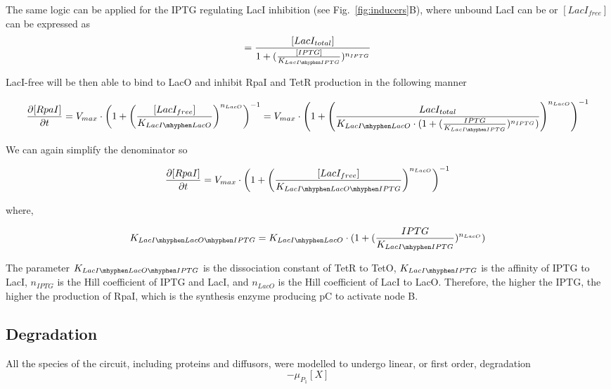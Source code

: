 The same logic can be applied for the IPTG regulating LacI inhibition (see Fig.~\ref{fig:inducers}B),
where unbound LacI can be or $[LacI_{free}]$ can be expressed as
\begin{equation}
[LacI{free}] =  \frac{[LacI_{total}]}{1+(\frac{[IPTG]}{K_{LacI \mhyphen IPTG}})^{n_{IPTG}}}
\end{equation}

LacI-free will be then able to bind to LacO and inhibit RpaI and TetR production in the following manner

\begin{equation}
    \pdv{[RpaI]}{t} = V_{max}\cdot \left(1+\left(\frac{[LacI_{free}]}{K_{LacI \mhyphen LacO}}\right)^{n_{LacO}}\right)^{-1} = V_{max} \cdot \left(1+\left(\frac{LacI_{total}}{K_{LacI \mhyphen LacO}\cdot(1+(\frac{IPTG}{K_{LacI \mhyphen IPTG}})^{n_{IPTG}})}\right)^{n_{LacO}}\right)^{-1}
\end{equation}


We can again simplify the denominator so

\begin{equation}
    \pdv{[RpaI]}{t} = V_{max}\cdot \left(1+\left(\frac{[LacI_{free}]}{K_{LacI \mhyphen LacO \mhyphen IPTG }}\right)^{n_{LacO}}\right)^{-1}
\end{equation}

where,

\begin{equation}
    K_{LacI \mhyphen LacO \mhyphen IPTG} = K_{LacI \mhyphen LacO}\cdot(1+(\frac{IPTG}{K_{LacI \mhyphen IPTG}})^{n_{LacO}})
\end{equation}

The parameter $K_{LacI \mhyphen LacO \mhyphen IPTG}$ is the dissociation constant of TetR to TetO, $K_{LacI \mhyphen IPTG}$
is the affinity of IPTG to LacI, $n_{IPTG}$ is the Hill coefficient of IPTG and LacI,
and $n_{LacO}$ is the Hill coefficient of LacI to LacO.
Therefore, the higher the IPTG, the higher the production of RpaI, which is the synthesis enzyme producing pC to activate node B.




\subsection{Degradation}
All the species of the circuit, including proteins and diffusors,
were modelled to undergo linear, or first order, degradation
\begin{equation}
    -\mu_{P_{1}}[X]
    \label{linear degradation}
\end{equation}


